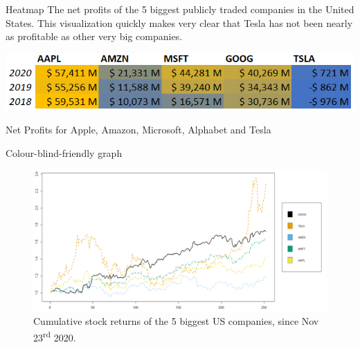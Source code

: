 \documentclass{beamer}
\begin{document}
\begin{frame}{Heatmap}
The net profits of the 5 biggest publicly traded companies in the United States. This visualization quickly makes very clear that Tesla has not been nearly as profitable as other very big companies.
\bigbreak
\begin{table}
\includegraphics[scale=0.7]{heatmap.png}
\caption{Net Profits for Apple, Amazon, Microsoft, Alphabet and Tesla }
\end{table}
\end{frame}

 \begin{frame}{Colour-blind-friendly graph}
 \begin{figure}[h!]
  \caption{Cumulative stock returns of the 5 biggest US companies, since Nov 23\textsuperscript{rd} 2020.}
   \includegraphics[scale=0.22]{cumreturns.png}
\end{figure}

\end{frame}

\begin{frame}
\printbibliography
\end{frame}

\begin{frame}
\printbibliography
\end{frame}
\end{document}

